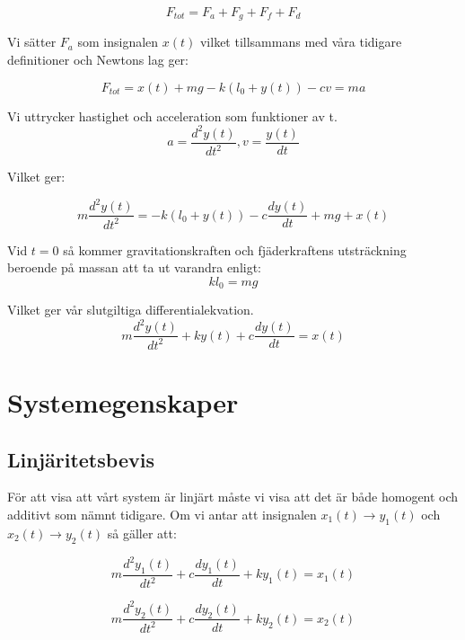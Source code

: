 \documentclass[10pt,a4paper]{article}
\begin{document}
\begin{equation}
F_{tot} = F_a + F_g + F_f + F_d
\end{equation}

Vi sätter $F_a$ som insignalen $x(t)$ vilket tillsammans med våra tidigare definitioner och Newtons lag ger:

\begin{equation}
F_{tot} = x(t) + mg - k(l_0+y(t)) - cv = ma
\end{equation}

Vi uttrycker hastighet och acceleration som funktioner av t.
\begin{equation}
a = \frac{d^2y(t)}{dt^2} , v = \frac{y(t)}{dt}
\end{equation}

Vilket ger:

\begin{equation}
 m\frac{d^2y(t)}{dt^2} =  -k(l_0 + y(t)) -c\frac{dy(t)}{dt} + mg +  x(t)
\end{equation}

Vid $t = 0$ så kommer gravitationskraften och fjäderkraftens utsträckning beroende på massan att ta ut varandra enligt:
\begin{equation}
k  l_0 = mg
\end{equation}

Vilket ger vår slutgiltiga differentialekvation.
\begin{equation}
 m\frac{d^2y(t)}{dt^2} + k  y(t) + c\frac{dy(t)}{dt} = x(t)
\end{equation}


\section{Systemegenskaper}

\subsection{Linjäritetsbevis}

För att visa att vårt system är linjärt måste vi visa att det är både homogent och additivt som nämnt tidigare. Om vi antar att insignalen $x_1(t) \rightarrow y_1(t)$ och $x_2(t) \rightarrow y_2(t)$ så gäller att:

\begin{equation}
m\frac{d^2y_1(t)}{dt^2} + c\frac{dy_1(t)}{dt} + ky_1(t) = x_1(t)
\end{equation}

\begin{equation}
m\frac{d^2y_2(t)}{dt^2} + c\frac{dy_2(t)}{dt} + ky_2(t) = x_2(t)
\end{equation}
\end{document}
